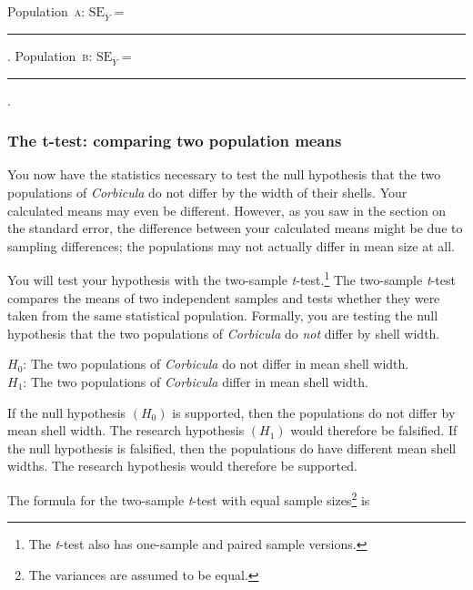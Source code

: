 \documentclass[12pt]{exam}
\newcommand*\meanY{\overline{Y\kern1.67pt}\kern-1.67pt}
\newcommand*\meansubY{\overline{Y}}
\newcommand*\ttest{\emph{t}-test}
\newcommand*\Popa{Population~\textsc{a}}
\newcommand*\Popb{Population~\textsc{b}}
\newcommand*\Corbicula{\textit{Corbicula}}
\newcommand*\AnswerBlank{\rule{0.75in}{0.4pt}\kern0.67pt.}
\begin{document}
\begin{questions}
\bigskip

\Popa{}: $\mathrm{SE}_{\meansubY} =$  \AnswerBlank{} \qquad 
\Popb{}: $\mathrm{SE}_{\meansubY} =$  \AnswerBlank{}


\subsubsection*{The t-test: comparing two population means}

You now have the statistics necessary to test the null hypothesis that the two populations of \Corbicula{} do not differ by the width of their shells. Your calculated means may even be different. However, as you saw in the section on the standard error, the difference between your calculated means might be due to sampling differences; the populations may not actually differ in mean size at all.

You will test your hypothesis with the two-sample \ttest{}.\footnote{The \ttest{} also has one-sample and paired sample versions.} The two-sample \ttest{} compares the means of two independent samples and tests whether they were taken from the same statistical population. Formally, you are testing the null hypothesis that the two populations of \Corbicula{} do \emph{not} differ by shell width. 

\hspace*{1em} $H_0$: The two populations of \Corbicula{} do not differ in mean shell width.\\
\hspace*{1em} $H_1$: The two populations of \Corbicula{} differ in mean shell width.

If the null hypothesis $\left(H_0\right)$ is supported, then the populations do not differ by mean shell width. The research hypothesis $\left(H_1\right)$ would therefore be falsified. If the null hypothesis is falsified, then the populations do have different mean shell widths. The research hypothesis would therefore be supported.

The formula for the two-sample \ttest{} with equal sample sizes\footnote{The variances are assumed to be equal.} is



\end{questions}
\end{document}
